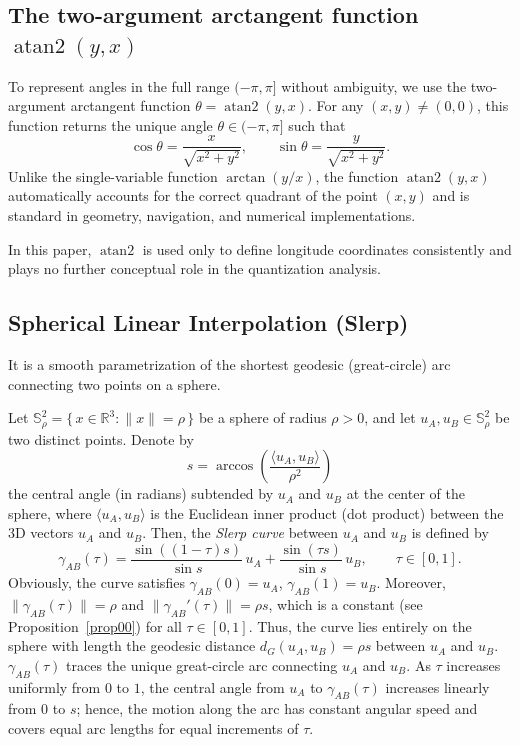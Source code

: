 \documentclass[12pt, reqno]{amsart}
\theoremstyle{plain}
\theoremstyle{definition}
\renewcommand{\gg}{\gamma}%
\newcommand{\gt}{\tau}
\newcommand{\tit}{\textit}%
\newcommand{\D}[1]{\mathbb{#1}}%
\begin{document}
\subsection{The two-argument arctangent function
\texorpdfstring{$\operatorname{atan2}(y,x)$}{atan2}}

To represent angles in the full range $(-\pi,\pi]$ without ambiguity, we use the
two-argument arctangent function $\theta=\operatorname{atan2}(y,x)$. For any
$(x,y)\neq(0,0)$, this function returns the unique angle $\theta\in(-\pi,\pi]$ such
that
\[
\cos\theta=\frac{x}{\sqrt{x^2+y^2}},\qquad
\sin\theta=\frac{y}{\sqrt{x^2+y^2}}.
\]
Unlike the single-variable function $\arctan(y/x)$, the function
$\operatorname{atan2}(y,x)$ automatically accounts for the correct quadrant of the
point $(x,y)$ and is standard in geometry, navigation, and numerical implementations.

In this paper, $\operatorname{atan2}$ is used only to define longitude coordinates
consistently and plays no further conceptual role in the quantization analysis.
 

\subsection{Spherical Linear Interpolation (Slerp)}
It is a smooth parametrization of the shortest geodesic (great-circle) arc connecting two points on a sphere. 

Let $\D S^2_\rho = \{\, x \in \mathbb{R}^3 : \|x\| = \rho \,\}$ be a sphere of radius $\rho > 0$, 
and let $u_A, u_B \in\D S^2_\rho$ be two distinct points. 
Denote by 
\[
s = \arccos\!\left( \frac{\langle u_A, u_B \rangle}{\rho^2} \right)
\]
the central angle (in radians) subtended by $u_A$ and $u_B$ at the center of the sphere, where $\langle u_A, u_B \rangle$ is the Euclidean inner product (dot product) between the 3D vectors $u_A$ and $u_B$. 
Then, the \tit{Slerp curve} between $u_A$ and $u_B$ is defined by
\[
\gamma_{AB}(\tau)
= \frac{\sin((1-\tau)s)}{\sin s}\,u_A
+ \frac{\sin(\tau s)}{\sin s}\,u_B,
\qquad \tau \in [0,1].
\]
Obviously, the curve satisfies $\gamma_{AB}(0)=u_A$, $\gamma_{AB}(1)=u_B$. Moreover, $\|\gamma_{AB}(\tau)\|=\rho$ and  $\|\gamma_{AB}'(\tau)\|=\rho s$, which is a constant (see Proposition~\ref{prop00})  for all $\tau \in [0,1]$. Thus, the curve lies entirely on the sphere with length the geodesic distance $d_G(u_A, u_B)=\rho s$ between $u_A$ and $u_B$. $\gg_{AB}(\gt)$ traces the unique great-circle arc connecting $u_A$ and $u_B$. As $\gt$ increases uniformly from $0$ to $1$, the central angle from $u_A$ to $\gamma_{AB}(\tau)$ increases linearly from $0$ to $s$; hence, the motion along the arc has constant angular speed and covers equal arc lengths for equal increments of $\gt$. 
\end{document}
